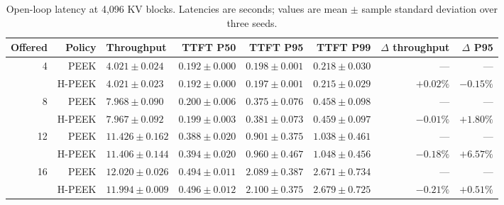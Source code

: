 \documentclass[10pt,twocolumn]{article}
\begin{document}
\begin{table}[t]
  \centering
  \small
  \caption{Open-loop latency at 4,096 KV blocks. Latencies are seconds;
  values are mean $\pm$ sample standard deviation over three seeds.}
  \label{tab:open-loop-latency}
  \begin{tabular}{rrlrrrrr}
    \toprule
    Offered & Policy & Throughput & TTFT P50 & TTFT P95 & TTFT P99 & $\Delta$ throughput & $\Delta$ P95 \\
    \midrule
    4 & PEEK   & $4.021\pm0.024$ & $0.192\pm0.000$ & $0.198\pm0.001$ & $0.218\pm0.030$ & --- & --- \\
      & H-PEEK & $4.021\pm0.023$ & $0.192\pm0.000$ & $0.197\pm0.001$ & $0.215\pm0.029$ & $+0.02\%$ & $-0.15\%$ \\
    8 & PEEK   & $7.968\pm0.090$ & $0.200\pm0.006$ & $0.375\pm0.076$ & $0.458\pm0.098$ & --- & --- \\
      & H-PEEK & $7.967\pm0.092$ & $0.199\pm0.003$ & $0.381\pm0.073$ & $0.459\pm0.097$ & $-0.01\%$ & $+1.80\%$ \\
    12 & PEEK   & $11.426\pm0.162$ & $0.388\pm0.020$ & $0.901\pm0.375$ & $1.038\pm0.461$ & --- & --- \\
       & H-PEEK & $11.406\pm0.144$ & $0.394\pm0.020$ & $0.960\pm0.467$ & $1.048\pm0.456$ & $-0.18\%$ & $+6.57\%$ \\
    16 & PEEK   & $12.020\pm0.026$ & $0.494\pm0.011$ & $2.089\pm0.387$ & $2.671\pm0.734$ & --- & --- \\
       & H-PEEK & $11.994\pm0.009$ & $0.496\pm0.012$ & $2.100\pm0.375$ & $2.679\pm0.725$ & $-0.21\%$ & $+0.51\%$ \\
    \bottomrule
  \end{tabular}
\end{table}
\end{document}
